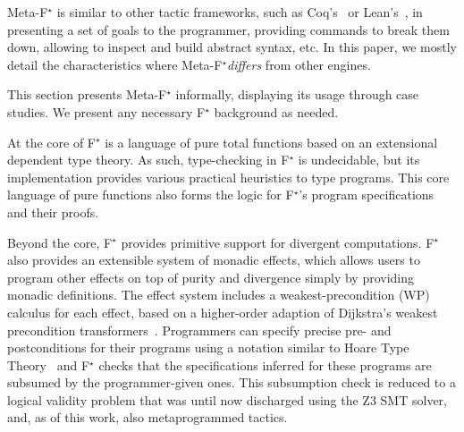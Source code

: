 \documentclass[runningheads]{llncs}
\newcommand\fstar{F$^\star$\xspace}
\newcommand\metafstar{Meta-F$^\star$\xspace}
\newcommand{\comm}[3]{\ifcheckpagebudget\else\ifdraft{{\color{#1}[#2: #3]}}\fi\fi}
\newcommand{\guido}[1]{\comm{blue}{Guido}{#1}}
\newcommand{\cpc}[1]{\comm{brown}{Cl\'ement}{#1}}
\begin{document}

\metafstar is similar to other tactic frameworks, such as
Coq's~\cite{Delahaye00} or Lean's~\cite{EbnerURAM17}, in presenting a
set of goals to the programmer, providing commands to break them down,
allowing to inspect and build abstract syntax, etc.
%
In this paper,
we mostly detail the characteristics where \metafstar \emph{differs}
from other engines.


This section presents \metafstar informally, displaying its usage
through case studies. We present any necessary \fstar background as needed.

\iffalse
At the core of \fstar is a language of pure total functions based on
an extensional dependent type theory. As such, type-checking in \fstar
is undecidable, but its implementation provides various practical
heuristics to type programs.
%
This core language of pure functions also forms the logic for \fstar's
program specifications and their proofs.

Beyond the core, \fstar provides primitive support for divergent
computations. \fstar also provides an extensible system of monadic
effects, which allows users to program other effects on top of purity
and divergence simply by providing monadic definitions.
%
The effect system includes a weakest-precondition (WP) calculus for
each effect, based on a higher-order adaption of Dijkstra's weakest
precondition transformers~\cite{fstar-pldi13,dm4free}.
%
Programmers can specify precise pre- and postconditions for their
programs using a notation similar to Hoare Type Theory~\cite{nmb08htt}
and \fstar checks that the specifications inferred for these programs
are subsumed by the programmer-given ones.
%
This subsumption check is reduced to a logical validity problem that
was until now discharged using the Z3 SMT solver, and, as of this
work, also metaprogrammed tactics.

%
\end{document}
